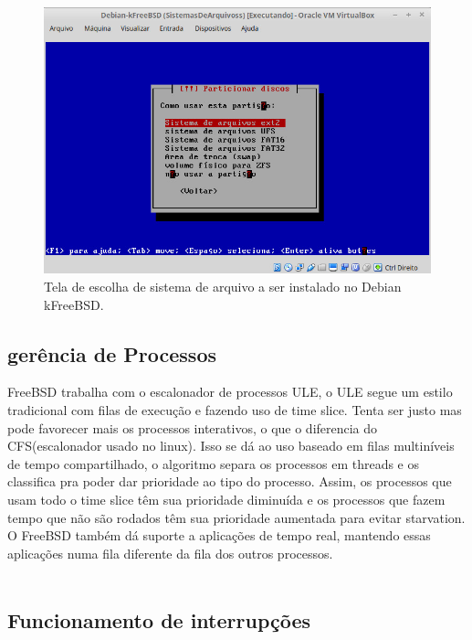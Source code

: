 \documentclass[conference]{IEEEtran}
\begin{document}
\begin{figure}[h!]
	\centering
	\includegraphics[scale=0.34]{SistemasArquivoskFreeBSD.jpeg}
	\caption{Tela de escolha de sistema de arquivo a ser instalado no Debian kFreeBSD.}
	\label{fig:SisAqrLinux}
\end{figure}

\subsection{gerência de Processos}\label{sec:BSDPROC}
FreeBSD trabalha com o escalonador de processos ULE, o ULE segue um estilo tradicional com filas de execução e fazendo uso de time slice. Tenta ser justo mas pode favorecer mais os processos interativos, o que o diferencia do CFS(escalonador usado no linux). Isso se dá ao uso baseado em filas multiníveis de tempo compartilhado, o algoritmo  separa os processos em threads e os classifica pra poder dar prioridade ao tipo do processo. Assim, os processos que usam todo o time slice têm sua prioridade diminuída e os processos que fazem tempo que não são rodados têm sua prioridade aumentada para evitar starvation.\\

O FreeBSD também dá suporte a aplicações de tempo real, mantendo essas aplicações numa fila diferente da fila dos outros processos.\cite{DesignImplementationFreeBSD}\\ \\



\subsection{Funcionamento de interrupções}\label{sec:BSDInt}
\end{document}
